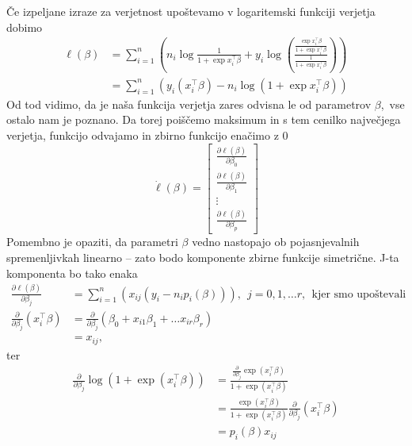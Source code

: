 \documentclass[12pt,a4paper]{amsart}
\theoremstyle{definition} %
\theoremstyle{plain} %
\begin{document}
Če izpeljane izraze za verjetnost upoštevamo v logaritemski funkciji verjetja dobimo
\begin{align}
    \ell(\beta) &= \sum_{i=1}^{n}\left( n_{i}\log{\frac{1}{1 + \exp{x_{i}^\top\beta}}}  + y_{i}\log{\left( \frac{\frac{\exp{x_{i}^{\top} \beta}}{1 + \exp{x_{i}^\top\beta}}}{\frac{1}{1 + \exp{x_{i}^\top\beta}}}  \right)} \right) \nonumber\\
                &= \sum_{i=1}^{n}\left( y_{i}(x_{i}^\top\beta) - n_{i}\log(1 + \exp{x_{i}^\top\beta})           \right)
\end{align}
Od tod vidimo, da je naša funkcija verjetja zares odvisna le od parametrov $\beta$,~vse ostalo nam je poznano. Da torej poiščemo maksimum in s tem
cenilko največjega verjetja, funkcijo odvajamo in zbirno funkcijo enačimo z 0
\[
    \dot{\ell}(\beta) = \begin{bmatrix}
                                 \frac{\partial \ell(\beta)}{\partial \beta_{0}} \\
                                 \frac{\partial \ell(\beta)}{\partial \beta_{1}} \\
                                 \vdots \\
                                 \frac{\partial \ell(\beta)}{\partial \beta_{p}}
                        \end{bmatrix}
\]
Pomembno je opaziti, da parametri $\beta$ vedno nastopajo ob pojasnjevalnih spremenljivkah linearno -- zato bodo komponente zbirne funkcije simetrične.
J-ta komponenta bo tako enaka
\begin{align}
    \frac{\partial \ell(\beta)}{\partial \beta_{j}} &= \sum_{i=1}^{n} \left(x_{ij}(y_{i} - n_{i}p_{i}(\beta))   \right),~~j = 0,1,\ldots r,~~\text{kjer~smo~upoštevali} \\
    \frac{\partial}{\partial \beta_{j}}(x_{i}^\top\beta) &= \frac{\partial}{\partial \beta_{j}}\left(\beta_{0} + x_{i1}\beta_{1} + \ldots x_{ir}\beta_{r}\right) \nonumber\\
                                                    &= x_{ij},
\end{align}
ter
\begin{align}                                         
    \frac{\partial}{\partial \beta_{j}} \log(1 + \exp(x_{i}^\top\beta)) &= \frac{ \frac{\partial}{\partial \beta_{j}}\exp(x_{i}^\top\beta) }{1 + \exp(x_{i}^\top\beta)} \nonumber \\
    &= \frac{\exp(x_{i}^\top\beta)}{1 + \exp(x_{i}^\top\beta)} \frac{\partial}{\partial \beta_{j}} (x_{i}^\top\beta) \nonumber \\
    &=p_{i}(\beta)x_{ij}
\end{align}
\end{document}
